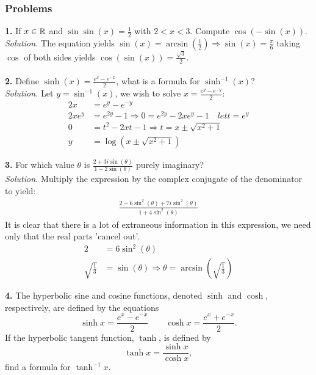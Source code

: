 \subsubsection{Problems}
\textbf{1.} If $x \in \mathbb{R}$ and $\sin\sin(x) = \frac{1}{2}$ with $2 < x < 3$. Compute $\cos(-\sin(x))$.\\

\textit{Solution.} The equation yields $\sin(x) = \arcsin\left(\frac{1}{2}\right) \Rightarrow \sin(x) = \frac{\pi}{6}$ taking $\cos$ of both sides 
yields $\cos(\sin(x)) = \frac{\sqrt{3}}{2}$.\\\\

\textbf{2.} Define $\sinh(x) = \frac{e^{x}-e^{-x}}{2}$, what is a formula for $\sinh^{-1}(x)$?\\

\textit{Solution.} Let $y = \sin^{-1}(x)$, we wish to solve $x = \frac{e^{y}-e^{-y}}{2}$:
\begin{align*}
	2x &= e^{y}-e^{-y}\\
	2xe^{y} &= e^{2y} - 1 \Rightarrow 0 = e^{2y} - 2xe^{y} - 1 \quad let t = e^{y}\\
	0 &= t^2 - 2xt - 1 \Rightarrow t = x \pm \sqrt{x^2 + 1}\\
	y &= \log(x \pm \sqrt{x^2 + 1})
\end{align*}

\textbf{3.} For which value $\theta$ is $\frac{2+3i\sin(\theta)}{1-2\sin(\theta)}$ purely imaginary?\\

\textit{Solution.} Multiply the expression by the complex conjugate of the denominator to yield:
\begin{align*}
	\frac{2 - 6\sin^{2}(\theta)+7i\sin^{2}(\theta)}{1 + 4\sin^{2}(\theta)}
\end{align*}
It is clear that there is a lot of extraneous information in this expression, we need only that the real parts 'cancel out'.
\begin{align*}
	2 &= 6\sin^{2}(\theta)\\
	\sqrt{\frac{1}{3}} &= \sin(\theta) \Rightarrow \theta = \arcsin\left(\sqrt{\frac{1}{3}}\right)
\end{align*}

\textbf{4.} The hyperbolic sine and cosine functions, denoted $\sinh$ and $\cosh$, respectively, are defined by the equations $$\sinh x = \frac{e^x - e^{-x}}{2} \qquad \cosh x = \frac{e^x + e^{-x}}{2}.$$ If the hyperbolic tangent function, $\tanh$, is defined by $$\tanh x = \frac{\sinh x}{\cosh x},$$ find a formula for $\tanh^{-1}x$. \\

